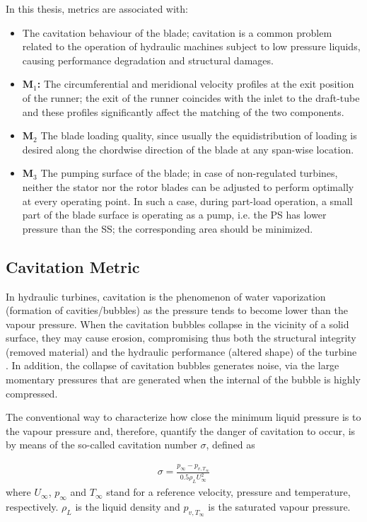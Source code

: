 In this thesis, metrics are associated with:
\begin{itemize}
\item{\textbf{}} The cavitation behaviour of the blade; cavitation is a common problem related to the operation of hydraulic machines subject to low pressure liquids, causing performance degradation and structural damages.
\item{\textbf{M$_1$:}} The circumferential and meridional velocity profiles at the exit position of the runner; the exit of the runner coincides with the inlet to the draft-tube and these profiles significantly affect the matching of the two components.
\item{\textbf{M$_2$}} The blade loading quality, since usually the equidistribution of loading is desired along the chordwise direction of the blade at any span-wise location.
\item{\textbf{M$_3$}} The pumping surface of the blade; in case of non-regulated turbines, neither the stator nor the rotor blades can be adjusted to perform optimally at every operating point. In such a case, during  part-load operation, a small part of the blade surface is operating as a pump, i.e. the PS has lower pressure than the SS; the corresponding area should be minimized.
\end{itemize}


\subsection{Cavitation Metric}
\label{cav.metric}
In hydraulic turbines, cavitation is the phenomenon of water vaporization (formation of cavities/bubbles) as the pressure tends to become lower than the vapour pressure. When the cavitation bubbles collapse in the vicinity of a solid surface, they may cause erosion, compromising thus both the structural integrity (removed material) and the hydraulic performance (altered shape) of the turbine \cite{thiruvengadam1974handbook,knapp1970cavitation,brennen1995cavitation}.  In addition, the collapse of cavitation bubbles generates noise, via the large momentary pressures that are generated when the internal of the bubble is highly compressed.

The conventional way to characterize how close the minimum liquid pressure is to the vapour pressure and, therefore, quantify the danger of cavitation to occur, is by means of the so-called cavitation number $\sigma$, defined as

\begin{eqnarray}
		\sigma=\frac{p_{\infty}-p_{v,T_{\infty}}}{0.5\rho_{L}U^2_{\infty}}
\label{Cavi}
\end{eqnarray}
where $U_{\infty}$, $p_{\infty}$ and $T_{\infty}$ stand for a reference velocity, pressure and temperature, respectively. $\rho_{L}$ is the liquid density and $p_{v,T_{\infty}}$  is the saturated vapour pressure. 

